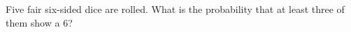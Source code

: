 Five fair six-sided dice are rolled. What is the probability that at least three of them show a $6$?
